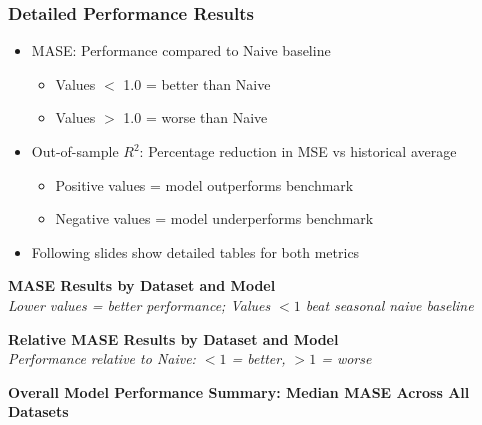 \documentclass[ignorenonframetext, 9pt]{beamer}
\begin{document}
\begin{frame}
    \frametitle{Detailed Performance Results}
    \begin{itemize}
    \item MASE: Performance compared to Naive baseline
    \begin{itemize}
      \item Values $<$ 1.0 = better than Naive
      \item Values $>$ 1.0 = worse than Naive
    \end{itemize}
    \item Out-of-sample $R^2$: Percentage reduction in MSE vs historical average
    \begin{itemize}
      \item Positive values = model outperforms benchmark
      \item Negative values = model underperforms benchmark
    \end{itemize}
    \item Following slides show detailed tables for both metrics
    \end{itemize}
  \end{frame}
  
\begin{frame}[plain]
    \tiny
    \vspace{-0.5cm}
    \centering
    \textbf{MASE Results by Dataset and Model}\\
    {\scriptsize \textit{Lower values = better performance; Values $<1$ beat seasonal naive baseline}}\\
    \vspace{0.2cm}
    
  \end{frame}
  
  \begin{frame}[plain]
    \tiny
    \vspace{-0.5cm}
    \centering
    \textbf{Relative MASE Results by Dataset and Model}\\
    {\scriptsize \textit{Performance relative to Naive: $<1$ = better, $>1$ = worse}}\\
    \vspace{0.2cm}
    
  \end{frame}

  \begin{frame}[plain]
    \tiny
    \vspace{-0.5cm}
    \centering
    \textbf{Overall Model Performance Summary: Median MASE Across All Datasets}\\
    \vspace{0.2cm}
    
  \end{frame}
\end{document}
